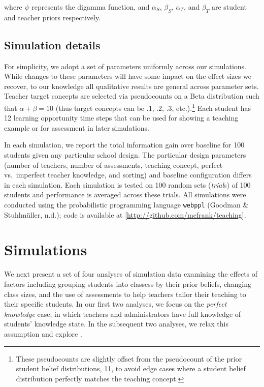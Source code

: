 \documentclass[10pt, letterpaper]{article}
\begin{document}
\noindent where \(\psi\) represents the digamma function, and
\(\alpha_S\), \(\beta_S\), \(\alpha_T\), and \(\beta_T\) are student and
teacher priors respectively.

\subsection{Simulation details}\label{simulation-details}

For simplicity, we adopt a set of parameters uniformly across our
simulations. While changes to these parameters will have some impact on
the effect sizes we recover, to our knowledge all qualitative results
are general across parameter sets. Teacher target concepts are selected
via pseudocounts on a Beta distribution such that
\(\alpha + \beta = 10\) (thus target concepts can be .1, .2, .3,
etc.).\footnote{These pseudocounts are slightly offset from the pseudocount of the prior student belief distributions, 11, to avoid edge cases where a student belief distribution perfectly matches the teaching concept.}
Each student has 12 learning opportunity time steps that can be used for
showing a teaching example or for assessment in later simulations.

In each simulation, we report the total information gain over baseline
for 100 students given any particular school design. The particular
design parameters (number of teachers, number of assessments, teaching
concept, perfect vs.~imperfect teacher knowledge, and sorting) and
baseline configuration differs in each simulation. Each simulation is
tested on 100 random sets (\emph{trial}s) of 100 students and
performance is averaged across these trials. All simulations were
conducted using the probabilistic programming language \texttt{webppl}
(Goodman \& Stuhlmüller, n.d.); code is available at
{[}\url{http://github.com/mcfrank/teaching}{]}.

\section{Simulations}\label{simulations}

We next present a set of four analyses of simulation data examining the
effects of factors including grouping students into classess by their
prior beliefs, changing class sizes, and the use of assessments to help
teachers tailor their teaching to their specific students. In our first
two analyses, we focus on the \emph{perfect knowledge} case, in which
teachers and administrators have full knowledge of students' knowledge
state. In the subsequent two analyses, we relax this assumption and
explore .
\end{document}
